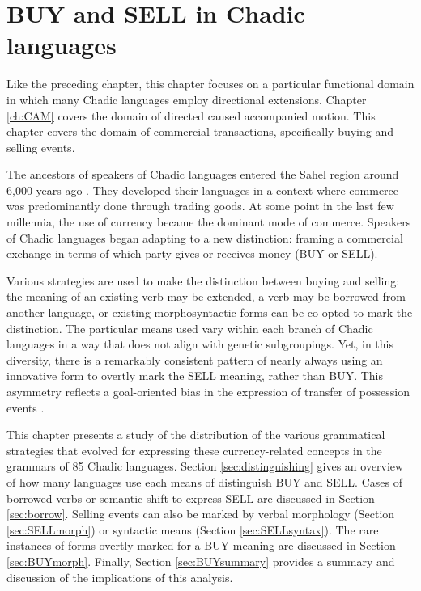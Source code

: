 \chapter{BUY and SELL in Chadic languages} \label{ch:buysell}

Like the preceding chapter, this chapter focuses on a particular functional domain in which many Chadic languages employ directional extensions. Chapter \ref{ch:CAM} covers the domain of directed caused accompanied motion. This chapter covers the domain of commercial transactions, specifically buying and selling events. 

The ancestors of speakers of Chadic languages entered the Sahel region around 6,000 years ago \citep[71]{maceachernUnderstandingDistributionsChadic2018a}. They developed their languages in a context where commerce was predominantly done through trading goods. At some point in the last few millennia, the use of currency became the dominant mode of commerce. Speakers of Chadic languages began adapting to a new distinction: framing a commercial exchange in terms of which party gives or receives money (BUY or SELL).

Various strategies are used to make the distinction between buying and selling: the meaning of an existing verb may be extended, a verb may be borrowed from another language, or existing morphosyntactic forms can be co-opted to mark the distinction. The particular means used vary within each branch of Chadic languages in a way that does not align with genetic subgroupings. Yet, in this diversity, there is a remarkably consistent pattern of nearly always using an innovative form to overtly mark the SELL meaning, rather than BUY. This asymmetry reflects a goal-oriented bias in the expression of transfer of possession events \citep{lakustaStartingEndImportance2005,georgakopoulosFramingDifferenceSources2015}.

This chapter presents a study of the distribution of the various grammatical strategies that evolved for expressing these currency-related concepts in the grammars of 85 Chadic languages. Section \ref{sec:distinguishing} gives an overview of how many languages use each means of distinguish BUY and SELL. Cases of borrowed verbs or semantic shift to express SELL are discussed in Section \ref{sec:borrow}. Selling events can also be marked by verbal morphology (Section \ref{sec:SELLmorph}) or syntactic means (Section \ref{sec:SELLsyntax}). The rare instances of forms overtly marked for a BUY meaning are discussed in Section \ref{sec:BUYmorph}. Finally, Section \ref{sec:BUYsummary} provides a summary and discussion of the implications of this analysis.

